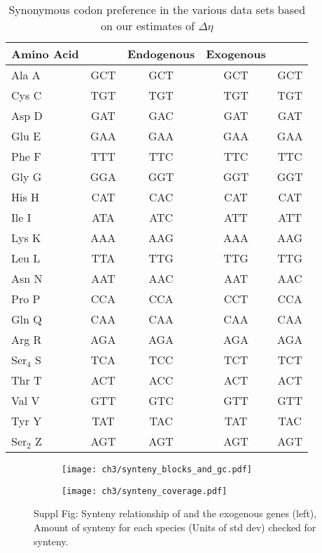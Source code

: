 \begin{table}
    \centering
\begin{tabular}{  l  c  c  c  c  }
\hline
	Amino Acid & \gossypii & Endogenous & Exogenous & \kluyveri \\ \hline \hline
	Ala A & GCT & GCT & GCT & GCT \\ \hline
	Cys C & TGT & TGT & TGT & TGT \\ \hline
	Asp D & GAT & GAC & GAT & GAT \\ \hline
	Glu E & GAA & GAA & GAA & GAA \\ \hline
	Phe F & TTT & TTC & TTC & TTC \\ \hline
	Gly G & GGA & GGT & GGT & GGT \\ \hline
	His H & CAT & CAC & CAT & CAT \\ \hline
	Ile I & ATA & ATC & ATT & ATT \\ \hline
	Lys K & AAA & AAG & AAA & AAG \\ \hline
	Leu L & TTA & TTG & TTG & TTG \\ \hline
	Asn N & AAT & AAC & AAT & AAC \\ \hline
	Pro P & CCA & CCA & CCT & CCA \\ \hline
	Gln Q & CAA & CAA & CAA & CAA \\ \hline
	Arg R & AGA & AGA & AGA & AGA \\ \hline
	Ser$_4$ S & TCA & TCC & TCT & TCT \\ \hline
	Thr T & ACT & ACC & ACT & ACT \\ \hline
	Val V & GTT & GTC & GTT & GTT \\ \hline
	Tyr Y & TAT & TAC & TAT & TAC \\ \hline
	Ser$_2$ Z & AGT & AGT & AGT & AGT \\ \hline
\end{tabular}
    \caption{Synonymous codon preference in the various data sets based on our estimates of $\Delta \eta$}
    \label{tab:codon_pref_deta}
\end{table}

\clearpage

\begin{figure}[h]
    \centering
    \begin{subfigure}
        \centering
        \texttt{[image: ch3/synteny\_blocks\_and\_gc.pdf]}
    \end{subfigure}
    \begin{subfigure}
        \centering
        \texttt{[image: ch3/synteny\_coverage.pdf]}
    \end{subfigure}
    \caption{Suppl Fig: Synteny relationship of \gossypii and the exogenous genes (left), Amount of synteny for each species (Units of std dev) checked for synteny.}
    \label{fig:synteny_species}
\end{figure}

